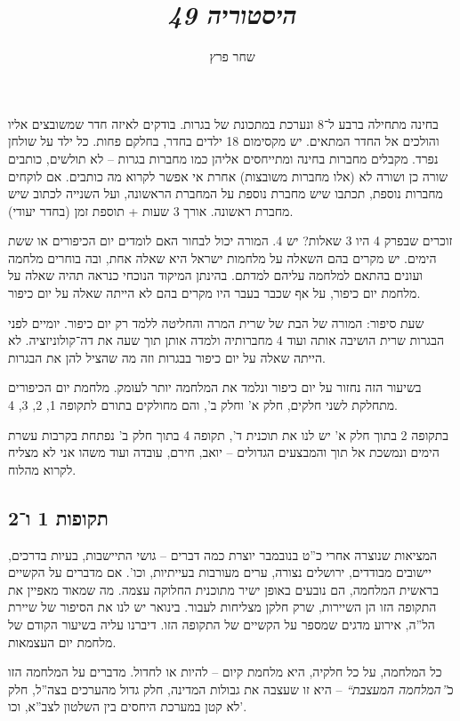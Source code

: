 \documentclass[]{../../../../tex/classes/styledArticle}
\author{שחר פרץ}
\title{\textit{היסטוריה 49}}
\begin{document}
	\maketitle
	
	
	בחינה מתחילה ברבע ל־8 ונערכת במתכונת של בגרות. בודקים לאיזה חדר שמשובצים אליו והולכים אל החדר המתאים. יש מקסימום 18 ילדים בחדר, בחלקם פחות. כל ילד על שולחן נפרד. מקבלים מחברות בחינה ומתייחסים אליהן כמו מחברות בגרות – לא תולשים, כותבים שורה כן ושורה לא (אלו מחברות משובצות) אחרת אי אפשר לקרוא מה כותבים. אם לוקחים מחברות נוספת, תכתבו שיש מחברת נוספת על המחברת הראשונה, ועל השנייה לכתוב שיש מחברת ראשונה. אורך 3 שעות + תוספת זמן (בחדר יעודי). 
	
	זוכרים שבפרק 4 היו 3 שאלות? יש 4. המורה יכול לבחור האם לומדים יום הכיפורים או ששת הימים. יש מקרים בהם השאלה על מלחמות ישראל היא שאלה אחת, ובה בוחרים מלחמה ועונים בהתאם למלחמה עליהם למדתם. בהינתן המיקוד הנוכחי כנראה תהיה שאלה על מלחמת יום כיפור, על אף שכבר בעבר היו מקרים בהם לא הייתה שאלה על יום כיפור. 
	
	שעת סיפור: המורה של הבת של שרית המרה והחליטה ללמד רק יום כיפור. יומיים לפני הבגרות שרית הושיבה אותה ועוד 4 מחברותיה ולמדה אותן תוך שעה את דה־קולוניזציה. לא הייתה שאלה על יום כיפור בבגרות וזה מה שהציל להן את הבגרות. 
	
	בשיעור הזה נחזור על יום כיפור ונלמד את המלחמה יותר לעומק. מלחמת יום הכיפורים מתחלקת לשני חלקים, חלק א' וחלק ב', והם מחולקים בתורם לתקופה 1, 2, 3, 4. 
	
	בתקופה 2 בתוך חלק א' יש לנו את תוכנית ד', תקופה 4 בתוך חלק ב' נפתחת בקרבות עשרת הימים ונמשכת אל תוך והמבצעים הגדולים – יואב, חירם, עובדה ועוד משהו אני לא מצליח לקרוא מהלוח. 
	
	\subsection*{תקופות 1 ו־2}
	
	המציאות שנוצרה אחרי כ''ט בנובמבר יוצרת כמה דברים – גושי התיישבות, בעיות בדרכים, יישובים מבודדים, ירושלים נצורה, ערים מעורבות בעייתיות, וכו'. אם מדברים על הקשיים בראשית המלחמה, הם נובעים באופן ישיר מתוכנית החלוקה עצמה. מה שמאוד מאפיין את התקופה הזו הן השיירות, שרק חלקן מצליחות לעבור. בינואר יש לנו את הסיפור של שיירת הל''ה, אירוע מדגים שמספר על הקשיים של התקופה הזו. דיברנו עליה בשיעור הקודם של מלחמת יום העצמאות. 
	
	כל המלחמה, על כל חלקיה, היא מלחמת קיום – להיות או לחדול. מדברים על המלחמה הזו כ\textit{''המלחמה המעצבת``} – היא זו שעצבה את גבולות המדינה, חלק גדול מהערכים בצה''ל, חלק לא קטן במערכת היחסים בין השלטון לצב''א, וכו'. 
	
\end{document}
